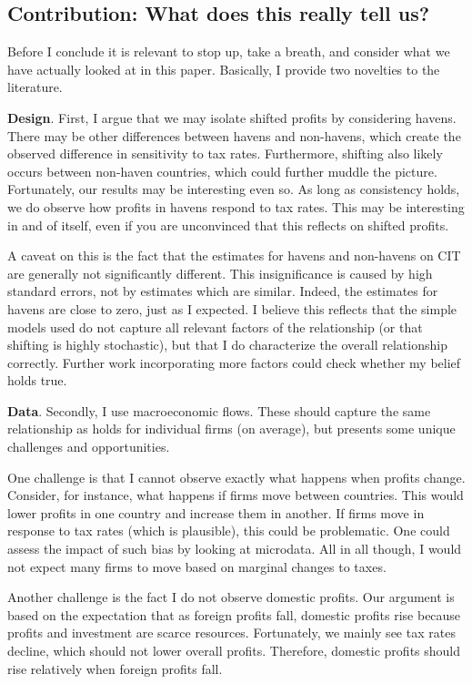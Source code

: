 \documentclass[twoside,a4paper,11pt]{article}
\begin{document}
\subsection{Contribution: What does this really tell us?}
Before I conclude it is relevant to stop up, take a breath, and consider what we have actually looked at in this paper. Basically, I provide two novelties to the literature. 

\textbf{Design}. First, I argue that we may isolate shifted profits by considering havens. There may be other differences between havens and non-havens, which create the observed difference in sensitivity to tax rates. Furthermore, shifting also likely occurs between non-haven countries, which could further muddle the picture. Fortunately, our results may be interesting even so. As long as consistency holds, we do observe how profits in havens respond to tax rates. This may be interesting in and of itself, even if you are unconvinced that this reflects on shifted profits. 

A caveat on this is the fact that the estimates for havens and non-havens on CIT are generally not significantly different. This insignificance is caused by high standard errors, not by estimates which are similar. Indeed, the estimates for havens are close to zero, just as I expected. I believe this reflects that the simple models used do not capture all relevant factors of the relationship (or that shifting is highly stochastic), but that I do characterize the overall relationship correctly. Further work incorporating more factors could check whether my belief holds true. 

\textbf{Data}. Secondly, I use macroeconomic flows. These should capture the same relationship as holds for individual firms (on average), but presents some unique challenges and opportunities. 

One challenge is that I cannot observe exactly what happens when profits change. Consider, for instance, what happens if  firms move between countries. This would lower profits in one country and increase them in another. If firms move in response to tax rates (which is plausible), this could be problematic. One could assess the impact of such bias by looking at microdata. All in all though, I would not expect many firms to move based on marginal changes to taxes. 

Another challenge is the fact I do not observe domestic profits.  Our argument is based on the expectation that as foreign profits fall, domestic profits rise because profits and investment are scarce resources. Fortunately, we mainly see tax rates decline, which should not lower overall profits.  Therefore, domestic profits should rise relatively  when foreign profits fall. 
\end{document}
